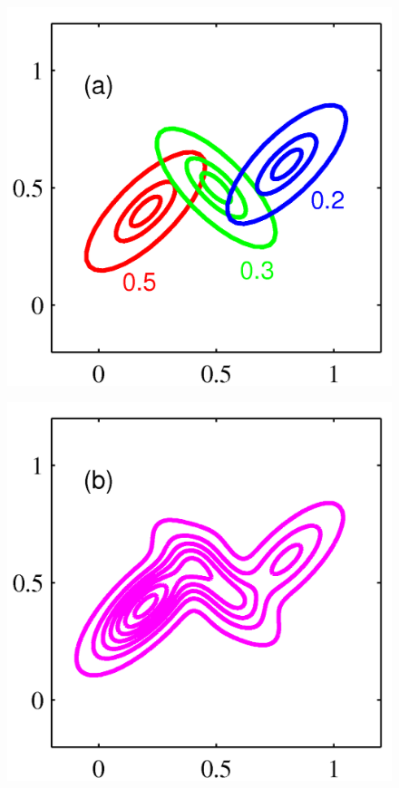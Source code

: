 \documentclass[b5paper]{book}
\numberwithin{equation}{chapter}
\begin{document}
{\begin{figure}[H]
		\label{fig:2-22}
		\begin{minipage}[t]{0.3\linewidth}
		\centering
		\includegraphics[scale=0.8]{Images/2-23a.png}
		\label{fig:2-23a}
		\end{minipage}
		\begin{minipage}[t]{0.3\linewidth}
		\centering
		\includegraphics[scale=0.8]{Images/2-23b.png}

\end{minipage}
\end{figure}}
\end{document}
